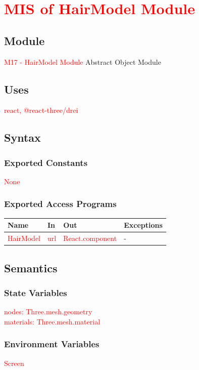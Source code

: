 \documentclass[12pt, titlepage]{article}
\begin{document}
\section{\textcolor{red}{MIS of HairModel Module}}
\subsection{Module}
\textcolor{red}{M17 - HairModel Module}
Abstract Object Module

\subsection{Uses}
\textcolor{red}{react, @react-three/drei}


\subsection{Syntax}

\subsubsection{Exported Constants}
\textcolor{red}{None}

\subsubsection{Exported Access Programs}
\begin{center}
\begin{tabular}{p{4cm} p{3cm} p{4cm} p{4cm}}
\hline
\textbf{Name} & \textbf{In} & \textbf{Out} & \textbf{Exceptions} \\
\hline
\textcolor{red}{HairModel} & \textcolor{red}{url} & \textcolor{red}{React.component} &  -\\
\hline
\end{tabular}
\end{center}

\subsection{Semantics}

\subsubsection{State Variables}
\textcolor{red}{nodes: Three.mesh.geometry}\\
\textcolor{red}{materials: Three.mesh.material}

\subsubsection{Environment Variables}
\textcolor{red}{Screen}
\end{document}
